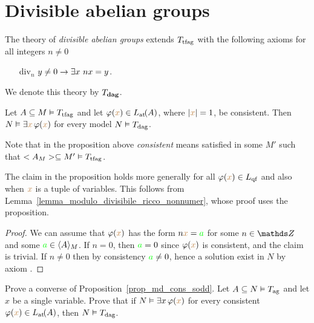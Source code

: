 \documentclass[creche.tex]{subfiles}
\begin{document}

\section{Divisible abelian groups}

The theory of \emph{divisible abelian groups\/} extends $T_{\rm tfag}$ with the following axioms for all  integers $n\neq0$
\begin{itemize}
\item[div$_n$] $y\neq0\imp\E x\ nx=y$.
\end{itemize} 
We denote this theory by \emph{$T_{\rm\bf dag}$}.

\begin{proposition}\label{prop_md_cons_sodd}
Let $A\subseteq M\models T_{\rm tfag}$ and let $\phi({\mr x})\in\atL(A)$, where $|{\mr x}|=1$, be consistent. Then $N\models\E {\mr x} \,\phi({\mr x})$ for every model $N\models T_{\rm dag}$.
\end{proposition}

Note that in the proposition above  \textit{consistent\/} means satisfied in some $M'$ such that $<A_M>\subseteq M'\models T_{\rm tfag}$.

The claim in the proposition holds more generally for all $\phi({\mr x})\in L_{\rm qf}$ and also when ${\mr x}$ is a tuple of variables. This follows from Lemma~\ref{lemma_modulo_divisibile_ricco_nonnumer}, whose proof uses the proposition.

\begin{proof}
We can assume that $\phi({\mr x})$ has the form $n {\mr x}= {\gr a}$ for some $n\in\ZZ$ and some ${\gr a}\in\<A\>_M$. If $n=0$, then ${\gr a}=0$ since $\phi({\mr x})$ is consistent, and the claim is trivial. If $n\neq0$ then by consistency ${\gr a}\neq0$, hence a solution exist in $N$ by axiom .
\end{proof}

\begin{exercise}
Prove a converse of Proposition~\ref{prop_md_cons_sodd}. Let $A\subseteq N\models T_{\rm ag}$ and let $x$ be a single variable. Prove that if $N\models\E x \,\phi({\mr x})$ for every consistent $\phi({\mr x})\in\atL(A)$, then $N\models T_{\rm dag}$.\QED
\end{exercise}
\end{document}
